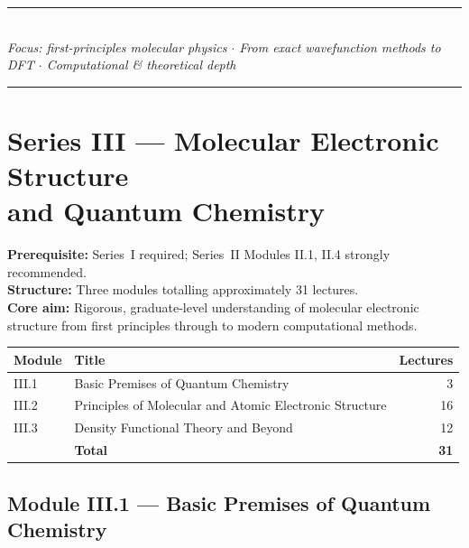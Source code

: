 \documentclass[11pt,a4paper]{article}
\begin{document}
\begin{center}
  \vfill
  {\color{accentgold}\rule{11cm}{0.8pt}}\\[0.4cm]
  {\small\itshape\color{white!80!darkblue}%
    Focus: first-principles molecular physics $\cdot$
    From exact wavefunction methods to DFT $\cdot$
    Computational \& theoretical depth}\\[0.3cm]
  {\color{accentgold}\rule{11cm}{0.8pt}}
\end{center}
\newpage
\nopagecolor
\color{black}

\section{Series III --- Molecular Electronic Structure \texorpdfstring{\\}{}and Quantum Chemistry}
\label{sec:seriesIII}

\begin{tcolorbox}[seriesbox, title={Series~III Overview}]
\textbf{Prerequisite:} Series~I required; Series~II Modules II.1, II.4 strongly recommended.\\
\textbf{Structure:} Three modules totalling approximately 31 lectures.\\
\textbf{Core aim:} Rigorous, graduate-level understanding of molecular electronic structure
from first principles through to modern computational methods.\\[4pt]
\begin{tabular}{llr}
\toprule
\textbf{Module} & \textbf{Title} & \textbf{Lectures}\\
\midrule
III.1 & Basic Premises of Quantum Chemistry & 3\\
III.2 & Principles of Molecular and Atomic Electronic Structure & 16\\
III.3 & Density Functional Theory and Beyond & 12\\
\midrule
 & \textbf{Total} & \textbf{31}\\
\bottomrule
\end{tabular}
\end{tcolorbox}

\subsection{Module III.1 --- Basic Premises of Quantum Chemistry}
\label{sec:mod-III1}
\end{document}

